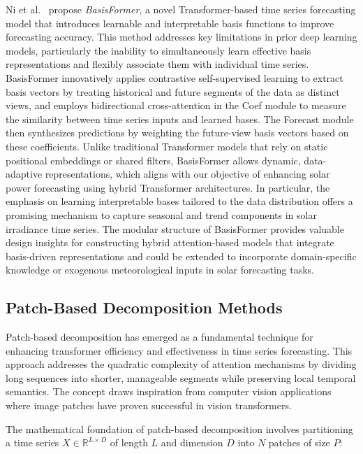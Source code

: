 \documentclass[12pt]{uomthesis}
\begin{document}
Ni et al.\ \cite{ni2023basisformer} propose \textit{BasisFormer}, a novel Transformer-based time series forecasting model that introduces learnable and interpretable basis functions to improve forecasting accuracy. This method addresses key limitations in prior deep learning models, particularly the inability to simultaneously learn effective basis representations and flexibly associate them with individual time series. BasisFormer innovatively applies contrastive self-supervised learning to extract basis vectors by treating historical and future segments of the data as distinct views, and employs bidirectional cross-attention in the Coef module to measure the similarity between time series inputs and learned bases. The Forecast module then synthesizes predictions by weighting the future-view basis vectors based on these coefficients. Unlike traditional Transformer models that rely on static positional embeddings or shared filters, BasisFormer allows dynamic, data-adaptive representations, which aligns with our objective of enhancing solar power forecasting using hybrid Transformer architectures. In particular, the emphasis on learning interpretable bases tailored to the data distribution offers a promising mechanism to capture seasonal and trend components in solar irradiance time series. The modular structure of BasisFormer provides valuable design insights for constructing hybrid attention-based models that integrate basis-driven representations and could be extended to incorporate domain-specific knowledge or exogenous meteorological inputs in solar forecasting tasks.

\subsection{Patch-Based Decomposition Methods}

Patch-based decomposition has emerged as a fundamental technique for enhancing transformer efficiency and effectiveness in time series forecasting. This approach addresses the quadratic complexity of attention mechanisms by dividing long sequences into shorter, manageable segments while preserving local temporal semantics. The concept draws inspiration from computer vision applications where image patches have proven successful in vision transformers.

The mathematical foundation of patch-based decomposition involves partitioning a time series $X \in \mathbb{R}^{L \times D}$ of length $L$ and dimension $D$ into $N$ patches of size $P$:
\end{document}
